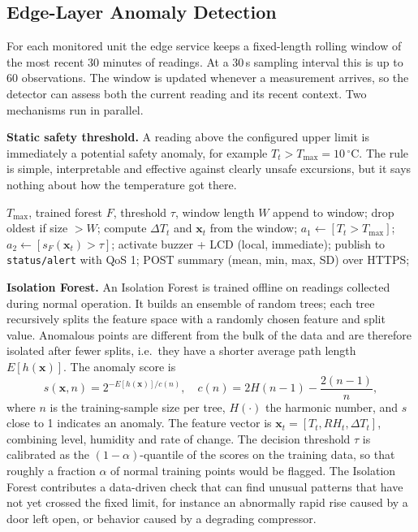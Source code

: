 \documentclass[conference]{IEEEtran}
\newcommand{\degC}{\ensuremath{^{\circ}}C}
\newcommand{\Tmax}{\ensuremath{T_{\max}}}
\begin{document}
\subsection{Edge-Layer Anomaly Detection}
For each monitored unit the edge service keeps a fixed-length rolling window of the most recent 30 minutes of readings. At a 30\,s sampling interval this is up to 60 observations. The window is updated whenever a measurement arrives, so the detector can assess both the current reading and its recent context. Two mechanisms run in parallel.

\textbf{Static safety threshold.} A reading above the configured upper limit is immediately a potential safety anomaly, for example $T_t > \Tmax = 10$\,\degC. The rule is simple, interpretable and effective against clearly unsafe excursions, but it says nothing about how the temperature got there.

\begin{algorithm}[t]
\caption{Edge processing loop for one unit}
\label{alg:edge}
\begin{algorithmic}[1]
\REQUIRE $T_{\max}$, trained forest $F$, threshold $\tau$, window length $W$
  \STATE append to window; drop oldest if size $> W$;
  \STATE compute $\Delta T_t$ and $\mathbf{x}_t$ from the window;
  \STATE $a_1 \leftarrow [T_t > T_{\max}]$;
  \STATE $a_2 \leftarrow [s_F(\mathbf{x}_t) > \tau]$;
    \STATE activate buzzer + LCD (local, immediate);
    \STATE publish to \texttt{status/alert} with QoS 1;
  \ENDIF
    \STATE POST summary (mean, min, max, SD) over HTTPS;
  \ENDIF
\ENDFOR
\end{algorithmic}
\end{algorithm}

\textbf{Isolation Forest.} An Isolation Forest \cite{iforest} is trained offline on readings collected during normal operation. It builds an ensemble of random trees; each tree recursively splits the feature space with a randomly chosen feature and split value. Anomalous points are different from the bulk of the data and are therefore isolated after fewer splits, i.e.\ they have a shorter average path length $E[h(\mathbf{x})]$. The anomaly score is
\begin{equation}
s(\mathbf{x},n) = 2^{-E[h(\mathbf{x})]/c(n)}, \quad c(n) = 2H(n-1) - \frac{2(n-1)}{n},
\label{eq:score}
\end{equation}
where $n$ is the training-sample size per tree, $H(\cdot)$ the harmonic number, and $s$ close to 1 indicates an anomaly. The feature vector is $\mathbf{x}_t = [T_t, RH_t, \Delta T_t]$, combining level, humidity and rate of change. The decision threshold $\tau$ is calibrated as the $(1-\alpha)$-quantile of the scores on the training data, so that roughly a fraction $\alpha$ of normal training points would be flagged. The Isolation Forest contributes a data-driven check that can find unusual patterns that have not yet crossed the fixed limit, for instance an abnormally rapid rise caused by a door left open, or behavior caused by a degrading compressor.
\end{document}
